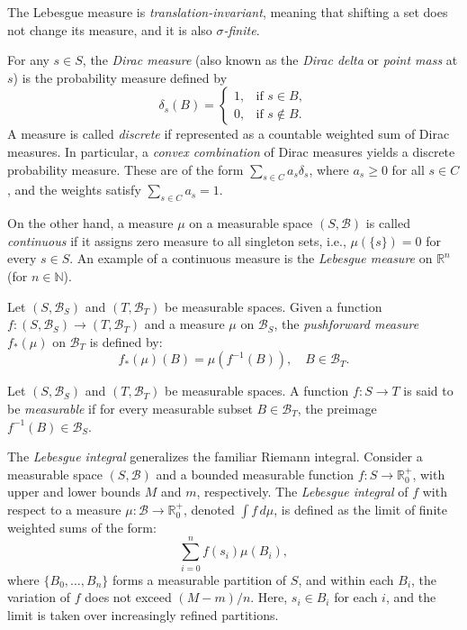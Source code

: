 The Lebesgue measure is \emph{translation-invariant}, meaning that shifting a set does not change its measure, and it is also \emph{$\sigma$-finite}.

For any $ s \in S $, the \emph{Dirac measure} (also known as the \emph{Dirac delta} or \emph{point mass} at \( s \)) is the probability measure defined by
$$
\delta_s(B) =
\begin{cases}
1, & \text{if } s \in B, \\
0, & \text{if } s \notin B.
\end{cases}
$$
A measure is called \emph{discrete} if represented as a countable weighted sum of Dirac measures. In particular, a \emph{convex combination} of Dirac measures yields a discrete probability measure. These are of the form $\sum_{s \in C} a_s \delta_s$,
where $ a_s \geq 0 $ for all $ s \in C $, and the weights satisfy $ \sum_{s \in C} a_s = 1 $.

On the other hand, a measure $ \mu $ on a measurable space $ (S, \mathcal{B}) $ is called \emph{continuous} if it assigns zero measure to all singleton sets, i.e., $ \mu(\{s\}) = 0 $ for every $ s \in S $. An example of a continuous measure is the \emph{Lebesgue measure} on $ \mathbb{R}^n $ (for $ n \in \mathbb{N} $).



\begin{definition} \label{def:pushforward_meas_1}
  Let $(S, \mathcal{B}_S)$ and $(T, \mathcal{B}_T)$ be measurable spaces. Given a function $f: (S, \mathcal{B}_S) \to (T, \mathcal{B}_T)$ and a measure $\mu$ on $\mathcal{B}_S$, the \emph{pushforward measure} $f_*(\mu)$ on $\mathcal{B}_T$ is defined by:
$$
f_*(\mu)(B) = \mu(f^{-1}(B)), \quad  B \in \mathcal{B}_T.
$$
\end{definition}



\begin{definition}
  Let $(S, \mathcal{B}_S)$ and $(T, \mathcal{B}_T)$ be measurable spaces. A function $f: S \to T$ is said to be \emph{measurable} if for every  measurable subset  $B \in \mathcal{B}_T$, the preimage $f^{-1}(B) \in \mathcal{B}_S$.
\end{definition}


\begin{definition} 
  The \emph{Lebesgue integral} generalizes the familiar Riemann integral. Consider a measurable space $(S, \mathcal{B})$ and a bounded measurable function $f \colon S \to \mathbb{R}_0^+$, with upper and lower bounds $M$ and $m$, respectively. The \emph{Lebesgue integral} of $f$ with respect to a measure $\mu \colon \mathcal{B} \to \mathbb{R}_0^+$, denoted $\int f \, d\mu$, is defined as the limit of finite weighted sums of the form:
$$
\sum_{i=0}^n f(s_i) \mu(B_i),
$$
where $\{B_0, \dots, B_n\}$ forms a measurable partition of $S$, and within each $B_i$, the variation of $f$ does not exceed $(M - m)/n$. Here, $s_i \in B_i$ for each $i$, and the limit is taken over increasingly refined partitions. 
\end{definition}


